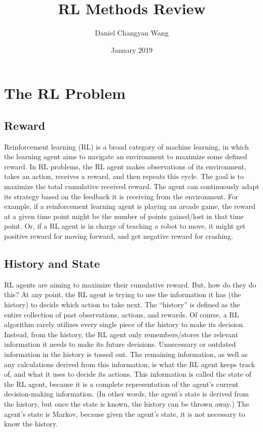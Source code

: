 \documentclass{article}
\title{RL Methods Review}
\author{Daniel Changyan Wang}
\date{January 2019}
\begin{document}
\maketitle

\section{The RL Problem}

\subsection{Reward}

Reinforcement learning (RL) is a broad category of machine learning, in which the learning agent aims to navigate an environment to maximize some defined reward. In RL problems, the RL agent makes observations of its environment, takes an action, receives a reward, and then repeats this cycle. The goal is to maximize the total cumulative received reward. The agent can continuously adapt its strategy based on the feedback it is receiving from the environment. For example, if a reinforcement learning agent is playing an arcade game, the reward at a given time point might be the number of points gained/lost in that time point. Or, if a RL agent is in charge of teaching a robot to move, it might get positive reward for moving forward, and get negative reward for crashing.

\subsection{History and State}

RL agents are aiming to maximize their cumulative reward. But, how do they do this? At any point, the RL agent is trying to use the information it has (the history) to decide which action to take next. The “history” is defined as the entire collection of past observations, actions, and rewards. Of course, a RL algorithm rarely utilizes every single piece of the history to make its decision. Instead, from the history, the RL agent only remembers/stores the relevant information it needs to make its future decisions. Unnecessary or outdated information in the history is tossed out. The remaining information, as well as any calculations derived from this information, is what the RL agent keeps track of, and what it uses to decide its actions. This information is called the state of the RL agent, because it is a complete representation of the agent’s current decision-making information. (In other words, the agent’s state is derived from the history, but once the state is known, the history can be thrown away.) The agent’s state is Markov, because given the agent’s state, it is not necessary to know the history.
\end{document}
